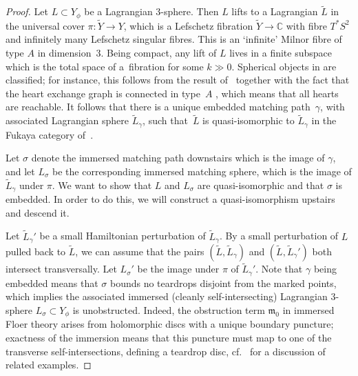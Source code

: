 \documentclass[10pt,a4paper]{amsart}
\def\bC{\mathbb{C}}
\theoremstyle{definition}
\numberwithin{equation}{section}
\begin{document}
\begin{proof}
Let $L \subset Y_{\phi}$ be a Lagrangian $3$-sphere. Then $L$ lifts to a Lagrangian $\tilde{L}$ in the universal cover $\pi\colon \tilde{Y} \to Y$, which is a Lefschetz fibration $\tilde{Y} \to \bC$ with fibre $T^*S^2$ and infinitely many Lefschetz singular fibres.
This is an `infinite' Milnor fibre of type $A$ in dimension~3.
Being compact, any lift of $L$ lives in a finite subspace which is the total space of a~fibration  for some $k\gg 0$.
Spherical objects in  are classified; for instance, this follows from the result of~\cite{King-QiuYu} together with the fact that the heart exchange graph is connected in type~$A$ \cite{Ikeda}, which means that all hearts are reachable.
It follows that there is a unique embedded matching path~$\gamma$, with associated Lagrangian sphere $\tilde{L}_\gamma$, such that~$\tilde{L}$ is quasi-isomorphic to $\tilde{L}_\gamma$ in the Fukaya category of~.

Let $\sigma$ denote the immersed matching path downstairs which is the image of $\gamma$, and let $L_\sigma$ be the corresponding immersed matching sphere, which is the image of $\tilde{L}_\gamma$ under $\pi$. We want to show that $L$ and $L_\sigma$ are quasi-isomorphic and that $\sigma$ is embedded. In order to do this, we will construct a quasi-isomorphism upstairs and descend it.

Let $\tilde{L}_\gamma'$ be a small Hamiltonian perturbation of $\tilde{L}_\gamma$.
By a small perturbation of $L$ pulled back to $\tilde{L}$, we can assume that the pairs $(\tilde{L}, \tilde{L}_\gamma )$
and $(\tilde{L}, \tilde{L}_\gamma')$ both intersect transversally.
Let $L_\sigma'$ be the image under $\pi$ of $\tilde{L}_\gamma'$.
Note that $\gamma$ being embedded means that $\sigma$ bounds no teardrops disjoint from the marked points, which implies the associated immersed (cleanly self-intersecting) Lagrangian 3-sphere $L_{\sigma} \subset Y_{\phi}$ is unobstructed. Indeed, the obstruction term $\mathfrak{m}_0$ in immersed Floer theory arises from holomorphic discs with a unique boundary puncture; exactness of the immersion means that this puncture must map to one of the transverse self-intersections, defining a teardrop disc, cf.~\cite[Section 13.3]{Akaho-Joyce} for a discussion of related examples.


\end{proof}
\end{document}
